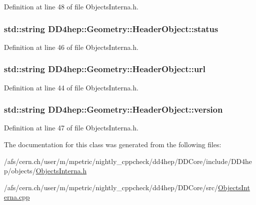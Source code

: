 Definition at line 48 of file ObjectsInterna.h.\hypertarget{class_d_d4hep_1_1_geometry_1_1_header_object_a20972a1281cbc8afec103918e9cdae43}{
\subsubsection[{status}]{\setlength{\rightskip}{0pt plus 5cm}std::string {\bf DD4hep::Geometry::HeaderObject::status}}}
\label{class_d_d4hep_1_1_geometry_1_1_header_object_a20972a1281cbc8afec103918e9cdae43}


Definition at line 46 of file ObjectsInterna.h.\hypertarget{class_d_d4hep_1_1_geometry_1_1_header_object_a702018d66501a7a062895ca2f481e697}{
\subsubsection[{url}]{\setlength{\rightskip}{0pt plus 5cm}std::string {\bf DD4hep::Geometry::HeaderObject::url}}}
\label{class_d_d4hep_1_1_geometry_1_1_header_object_a702018d66501a7a062895ca2f481e697}


Definition at line 44 of file ObjectsInterna.h.\hypertarget{class_d_d4hep_1_1_geometry_1_1_header_object_a9a2b7104b14240b8b884ff0519307204}{
\subsubsection[{version}]{\setlength{\rightskip}{0pt plus 5cm}std::string {\bf DD4hep::Geometry::HeaderObject::version}}}
\label{class_d_d4hep_1_1_geometry_1_1_header_object_a9a2b7104b14240b8b884ff0519307204}


Definition at line 47 of file ObjectsInterna.h.

The documentation for this class was generated from the following files:\begin{DoxyCompactItemize}
\item 
/afs/cern.ch/user/m/mpetric/nightly\_\-cppcheck/dd4hep/DDCore/include/DD4hep/objects/\hyperlink{_objects_interna_8h}{ObjectsInterna.h}\item 
/afs/cern.ch/user/m/mpetric/nightly\_\-cppcheck/dd4hep/DDCore/src/\hyperlink{_objects_interna_8cpp}{ObjectsInterna.cpp}\end{DoxyCompactItemize}
